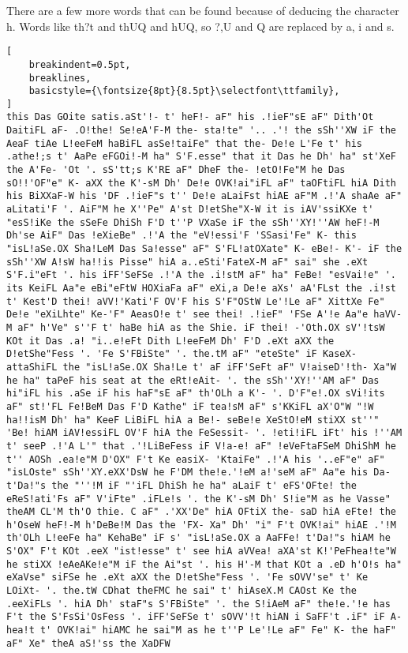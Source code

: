 \documentclass{uva-inf-bachelor-thesis}
\begin{document}
There are a few more words that can be found because of deducing the character
h. Words like th?t and thUQ and hUQ, so ?,U and Q are replaced by a, i and s.
\begin{lstlisting}[
    breakindent=0.5pt,
    breaklines,
    basicstyle={\fontsize{8pt}{8.5pt}\selectfont\ttfamily},
]
this Das GOite satis.aSt'!- t' heF!- aF" his .!ieF"sE aF" Dith'Ot DaitiFL aF- .O!the! Se!eA'F-M the- sta!te" '.. .'! the sSh''XW iF the AeaF tiAe L!eeFeM haBiFL asSe!taiFe" that the- De!e L'Fe t' his .athe!;s t' AaPe eFGOi!-M ha" S'F.esse" that it Das he Dh' ha" st'XeF the A'Fe- 'Ot '. sS'tt;s K'RE aF" DheF the- !etO!Fe"M he Das sO!!'OF"e" K- aXX the K'-sM Dh' De!e OVK!ai"iFL aF" taOFtiFL hiA Dith his BiXXaF-W his 'DF .!ieF"s t'' De!e aLaiFst hiAE aF"M .!'A shaAe aF" aLitati'F '. AiF"M he X''Pe" A'st D!etShe"X-W it is iAV'ssiKXe t' "esS!iKe the sSeFe DhiSh F'D t''P VXaSe iF the sSh''XY!''AW heF!-M Dh'se AiF" Das !eXieBe" .!'A the "eV!essi'F 'SSasi'Fe" K- this "isL!aSe.OX Sha!LeM Das Sa!esse" aF" S'FL!atOXate" K- eBe!- K'- iF the sSh''XW A!sW ha!!is Pisse" hiA a..eSti'FateX-M aF" sai" she .eXt S'F.i"eFt '. his iFF'SeFSe .!'A the .i!stM aF" ha" FeBe! "esVai!e" '. its KeiFL Aa"e eBi"eFtW HOXiaFa aF" eXi,a De!e aXs' aA'FLst the .i!st t' Kest'D thei! aVV!'Kati'F OV'F his S'F"OStW Le'!Le aF" XittXe Fe" De!e "eXiLhte" Ke-'F" AeasO!e t' see thei! .!ieF" 'FSe A'!e Aa"e haVV-M aF" h'Ve" s''F t' haBe hiA as the Shie. iF thei! -'Oth.OX sV'!tsW KOt it Das .a! "i..e!eFt Dith L!eeFeM Dh' F'D .eXt aXX the D!etShe"Fess '. 'Fe S'FBiSte" '. the.tM aF" "eteSte" iF KaseX- attaShiFL the "isL!aSe.OX Sha!Le t' aF iFF'SeFt aF" V!aiseD'!th- Xa"W he ha" taPeF his seat at the eRt!eAit- '. the sSh''XY!''AM aF" Das hi"iFL his .aSe iF his haF"sE aF" th'OLh a K'- '. D'F"e!.OX sVi!its aF" st!'FL Fe!BeM Das F'D Kathe" iF tea!sM aF" s'KKiFL aX'O"W "!W ha!!isM Dh' ha" KeeF LiBiFL hiA a Be!- seBe!e XeStO!eM stiXX st''" 'Be! hiAM iAV!essiFL OV'F hiA the FeSessit- '. !eti!iFL iFt' his !''AM t' seeP .!'A L'" that .'!LiBeFess iF V!a-e! aF" !eVeFtaFSeM DhiShM he t'' AOSh .ea!e"M D'OX" F't Ke easiX- 'KtaiFe" .!'A his '..eF"e" aF" "isLOste" sSh''XY.eXX'DsW he F'DM the!e.'!eM a!'seM aF" Aa"e his Da- t'Da!"s the "''!M iF "'iFL DhiSh he ha" aLaiF t' eFS'OFte! the eReS!ati'Fs aF" V'iFte" .iFLe!s '. the K'-sM Dh' S!ie"M as he Vasse" theAM CL'M th'O thie. C aF" .'XX'De" hiA OFtiX the- saD hiA eFte! the h'OseW heF!-M h'DeBe!M Das the 'FX- Xa" Dh' "i" F't OVK!ai" hiAE .'!M th'OLh L!eeFe ha" KehaBe" iF s' "isL!aSe.OX a AaFFe! t'Da!"s hiAM he S'OX" F't KOt .eeX "ist!esse" t' see hiA aVVea! aXA'st K!'PeFhea!te"W he stiXX !eAeAKe!e"M iF the Ai"st '. his H'-M that KOt a .eD h'O!s ha" eXaVse" siFSe he .eXt aXX the D!etShe"Fess '. 'Fe sOVV'se" t' Ke LOiXt- '. the.tW CDhat theFMC he sai" t' hiAseX.M CAOst Ke the .eeXiFLs '. hiA Dh' staF"s S'FBiSte" '. the S!iAeM aF" the!e.'!e has F't the S'FsSi'OsFess '. iFF'SeFSe t' sOVV'!t hiAN i SaFF't .iF" iF A- hea!t t' OVK!ai" hiAMC he sai"M as he t''P Le'!Le aF" Fe" K- the haF" aF" Xe" theA aS!'ss the XaDFW
\end{lstlisting}
\vspace{20pt}
\clearpage
\end{document}
